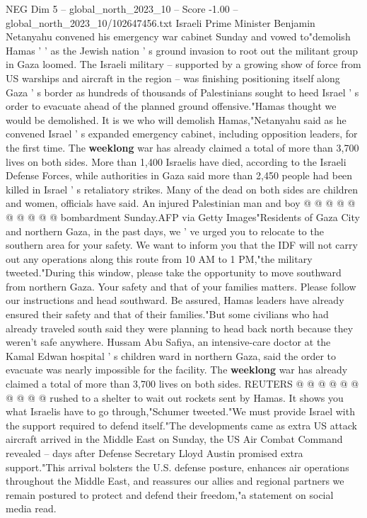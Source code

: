\begin{textsample}{NEG Dim 5 – global\_north\_2023\_10 – Score -1.00 – global\_north\_2023\_10/102647456.txt}  \label{ex:f5_neg_022}
Israeli Prime Minister Benjamin Netanyahu convened his emergency war cabinet Sunday and vowed to"demolish Hamas ' ' as the Jewish nation ' s ground invasion to root out the militant group in Gaza loomed.
The Israeli military -- supported by a growing show of force from US warships and aircraft in the region -- was finishing positioning itself along Gaza ' s border as hundreds of thousands of Palestinians sought to heed Israel ' s order to evacuate ahead of the planned ground offensive."Hamas thought we would be demolished.
It is we who will demolish Hamas,"Netanyahu said as he convened Israel ' s expanded emergency cabinet, including opposition leaders, for the first time.
The \textbf{weeklong} war has already claimed a total of more than 3,700 lives on both sides.
More than 1,400 Israelis have died, according to the Israeli Defense Forces, while authorities in Gaza said more than 2,450 people had been killed in Israel ' s retaliatory strikes.
Many of the dead on both sides are children and women, officials have said.
An injured Palestinian man and boy @ @ @ @ @ @ @ @ @ @ bombardment Sunday.AFP via Getty Images"Residents of Gaza City and northern Gaza, in the past days, we ' ve urged you to relocate to the southern area for your safety.
We want to inform you that the IDF will not carry out any operations along this route from 10 AM to 1 PM,"the military tweeted."During this window, please take the opportunity to move southward from northern Gaza.
Your safety and that of your families matters.
Please follow our instructions and head southward.
Be assured, Hamas leaders have already ensured their safety and that of their families."But some civilians who had already traveled south said they were planning to head back north because they weren't safe anywhere.
Hussam Abu Safiya, an intensive-care doctor at the Kamal Edwan hospital ' s children ward in northern Gaza, said the order to evacuate was nearly impossible for the facility.
The \textbf{weeklong} war has already claimed a total of more than 3,700 lives on both sides.
REUTERS @ @ @ @ @ @ @ @ @ @ rushed to a shelter to wait out rockets sent by Hamas.
It shows you what Israelis have to go through,"Schumer tweeted."We must provide Israel with the support required to defend itself."The developments came as extra US attack aircraft arrived in the Middle East on Sunday, the US Air Combat Command revealed -- days after Defense Secretary Lloyd Austin promised extra support."This arrival bolsters the U.S. defense posture, enhances air operations throughout the Middle East, and reassures our allies and regional partners we remain postured to protect and defend their freedom,"a statement on social media read.

\end{textsample}
